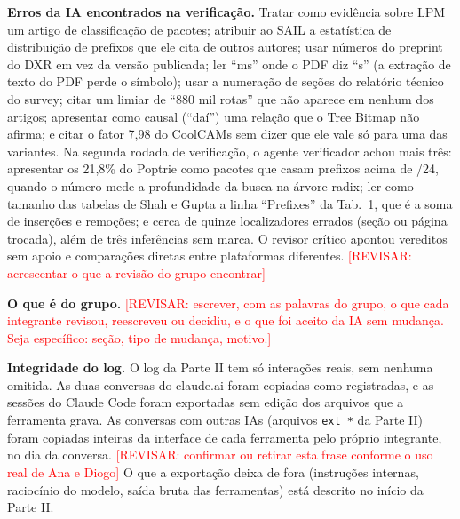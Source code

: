 \documentclass[11pt,a4paper]{article}
\newcommand{\revisar}[1]{\textcolor{red}{[REVISAR: #1]}}
\begin{document}
\textbf{Erros da IA encontrados na verificação.} Tratar como evidência sobre LPM um artigo de classificação de
pacotes; atribuir ao SAIL a estatística de distribuição de prefixos que ele cita de outros autores; usar números do
preprint do DXR em vez da versão publicada; ler ``ms'' onde o PDF diz ``\textmu s'' (a extração de texto do PDF perde o
símbolo); usar a numeração de seções do relatório técnico do survey; citar um limiar de ``880 mil rotas'' que não aparece
em nenhum dos artigos; apresentar como causal (``daí'') uma relação que o Tree Bitmap não afirma; e citar o fator 7,98 do
CoolCAMs sem dizer que ele vale só para uma das variantes. Na segunda rodada de verificação, o agente verificador achou
mais três: apresentar os 21,8\% do Poptrie como pacotes que casam prefixos acima de /24, quando o número mede a
profundidade da busca na árvore radix; ler como tamanho das tabelas de Shah e Gupta a linha ``Prefixes'' da Tab.~1, que
é a soma de inserções e remoções; e cerca de quinze localizadores errados (seção ou página trocada), além de três
inferências sem marca. O revisor crítico apontou vereditos sem apoio e comparações diretas entre plataformas
diferentes. \revisar{acrescentar o que a revisão do grupo encontrar}

\textbf{O que é do grupo.} \revisar{escrever, com as palavras do grupo, o que cada integrante revisou, reescreveu ou
decidiu, e o que foi aceito da IA sem mudança. Seja específico: seção, tipo de mudança, motivo.}

\textbf{Integridade do log.} O log da Parte II tem só interações reais, sem nenhuma omitida. As duas conversas do
claude.ai foram copiadas como registradas, e as sessões do Claude Code foram exportadas sem edição dos arquivos que a
ferramenta grava. As conversas com outras IAs (arquivos \texttt{ext\_*} da Parte II) foram copiadas inteiras da
interface de cada ferramenta pelo próprio integrante, no dia da conversa. \revisar{confirmar ou retirar esta frase
conforme o uso real de Ana e Diogo} O que a exportação deixa de fora (instruções internas, raciocínio do modelo, saída bruta das
ferramentas) está descrito no início da Parte II.
\end{document}
